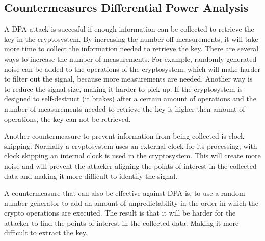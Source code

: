 \subsection{Countermeasures Differential Power Analysis}
A DPA attack is succesful if enough information can be collected to retrieve the key in the cryptosystem. By increasing the number off measurements, it will take more time to collect the information needed to retrieve the key. 
There are several ways to increase the number of measurements. For example, randomly generated noise can be added to the operations of the cryptosystem, which will make harder to filter out the signal, because more measurements are needed. Another way is to reduce the signal size, making it harder to pick up. 
If the cryptosystem is designed to self-destruct (it brakes) after a certain amount of operations and the number of measurements needed to retrieve the key is higher then amount of operations, the key can not be retrieved.

Another countermeasure to prevent information from being collected is clock skipping. Normally a cryptosystem uses an external clock for its processing, with clock skipping an internal clock is used in the cryptosystem. This will create more noise and will prevent the attacker aligning the points of interest in the collected data and making it more difficult to identify the signal. 

A countermeasure that can also be effective against DPA is, to use a random number generator to add an amount of unpredictability in the order in which the crypto operations are executed. The result is that it will be harder for the attacker to find the points of interest in the collected data. Making it more difficult to extract the key. 



